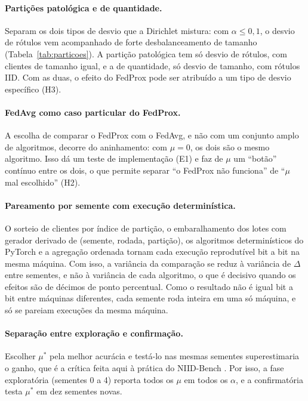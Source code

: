 \paragraph{Partições patológica e de quantidade.} Separam os dois tipos de desvio que a Dirichlet mistura: com $\alpha \leq 0{,}1$, o desvio de rótulos vem acompanhado de forte desbalanceamento de tamanho (Tabela~\ref{tab:particoes}). A partição patológica tem só desvio de rótulos, com clientes de tamanho igual, e a de quantidade, só desvio de tamanho, com rótulos IID. Com as duas, o efeito do FedProx pode ser atribuído a um tipo de desvio específico (H3).

\paragraph{FedAvg como caso particular do FedProx.} A escolha de comparar o FedProx com o FedAvg, e não com um conjunto amplo de algoritmos, decorre do aninhamento: com $\mu = 0$, os dois são o mesmo algoritmo. Isso dá um teste de implementação (E1) e faz de $\mu$ um ``botão'' contínuo entre os dois, o que permite separar ``o FedProx não funciona'' de ``$\mu$ mal escolhido'' (H2).

\paragraph{Pareamento por semente com execução determinística.} O sorteio de clientes por índice de partição, o embaralhamento dos lotes com gerador derivado de (semente, rodada, partição), os algoritmos determinísticos do PyTorch e a agregação ordenada tornam cada execução reprodutível bit a bit na mesma máquina. Com isso, a variância da comparação se reduz à variância de $\Delta$ entre sementes, e não à variância de cada algoritmo, o que é decisivo quando os efeitos são de décimos de ponto percentual. Como o resultado não é igual bit a bit entre máquinas diferentes, cada semente roda inteira em uma só máquina, e só se pareiam execuções da mesma máquina.

\paragraph{Separação entre exploração e confirmação.} Escolher $\mu^*$ pela melhor acurácia e testá-lo nas mesmas sementes superestimaria o ganho, que é a crítica feita aqui à prática do NIID-Bench \citep{li2022niidbench}. Por isso, a fase exploratória (sementes 0 a 4) reporta todos os $\mu$ em todos os $\alpha$, e a confirmatória testa $\mu^*$ em dez sementes novas.

